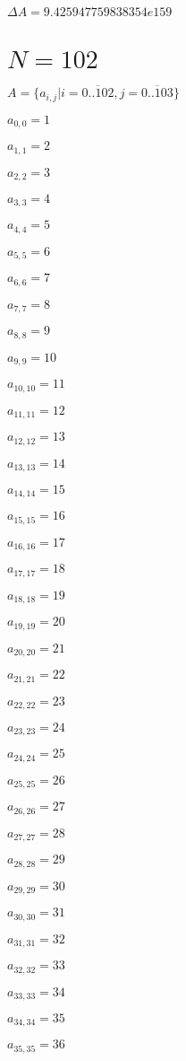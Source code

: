 \documentclass[a4paper,12pt]{article}
\begin{document}
$\Delta A = 9.425947759838354e159$



\section{ $N = 102$ }
$A = \{ a _{ i, j } | i = \overline { 0..102 }, j = \overline { 0..103 } \}$

$a _{ 0, 0 } = 1$

$a _{ 1, 1 } = 2$

$a _{ 2, 2 } = 3$

$a _{ 3, 3 } = 4$

$a _{ 4, 4 } = 5$

$a _{ 5, 5 } = 6$

$a _{ 6, 6 } = 7$

$a _{ 7, 7 } = 8$

$a _{ 8, 8 } = 9$

$a _{ 9, 9 } = 10$

$a _{ 10, 10 } = 11$

$a _{ 11, 11 } = 12$

$a _{ 12, 12 } = 13$

$a _{ 13, 13 } = 14$

$a _{ 14, 14 } = 15$

$a _{ 15, 15 } = 16$

$a _{ 16, 16 } = 17$

$a _{ 17, 17 } = 18$

$a _{ 18, 18 } = 19$

$a _{ 19, 19 } = 20$

$a _{ 20, 20 } = 21$

$a _{ 21, 21 } = 22$

$a _{ 22, 22 } = 23$

$a _{ 23, 23 } = 24$

$a _{ 24, 24 } = 25$

$a _{ 25, 25 } = 26$

$a _{ 26, 26 } = 27$

$a _{ 27, 27 } = 28$

$a _{ 28, 28 } = 29$

$a _{ 29, 29 } = 30$

$a _{ 30, 30 } = 31$

$a _{ 31, 31 } = 32$

$a _{ 32, 32 } = 33$

$a _{ 33, 33 } = 34$

$a _{ 34, 34 } = 35$

$a _{ 35, 35 } = 36$
\end{document}
